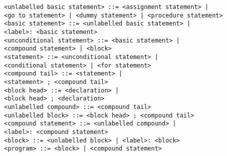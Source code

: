 \documentclass[a4paper,11pt]{article}
\begin{document}
\begin{flushleft}
\vspace{0.2em}\texttt{<unlabelled basic statement> ::= <assignment statement> |\\
  \hspace{1.0cm}<go to statement> | <dummy statement> | <procedure statement>}\\

\vspace{0.2em}\texttt{<basic statement> ::= <unlabelled basic statement> |\\
  \hspace{1.0cm}<label>: <basic statement>}\\

\vspace{0.2em}\texttt{<unconditional statement> ::= <basic statement> |\\
  \hspace{1.0cm}<compound statement> | <block>}\\

\vspace{0.2em}\texttt{<statement> ::= <unconditional statement> |\\
  \hspace{1.0cm}<conditional statement> | <for statement>}\\

\vspace{0.2em}\texttt{<compound tail> ::= <statement>  |\\
  \hspace{1.0cm}<statement> ; <compound tail>}\\

\vspace{0.2em}\texttt{<block head> ::=  <declaration> |\\
  \hspace{1.0cm}<block head> ; <declaration>}\\

\vspace{0.2em}\texttt{<unlabelled compound> ::=  <compound tail>}\\

\vspace{0.2em}\texttt{<unlabelled block> ::= <block head> ; <compound tail>}\\

\vspace{0.2em}\texttt{<compound statement> ::= <unlabelled compound> |\\
  \hspace{1.0cm}<label>: <compound statement>}\\

\vspace{0.2em}\texttt{<block> ::= <unlabelled block> | <label>: <block>}\\

\vspace{0.2em}\texttt{<program> ::= <block> | <compound statement>}\\
\end{flushleft}
\end{document}

